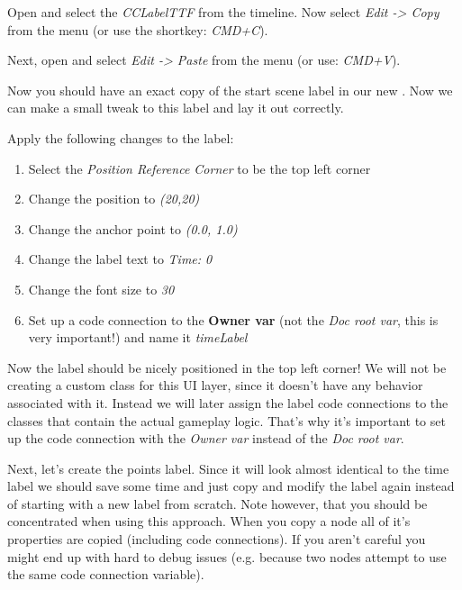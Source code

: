 \begin{leftbar}
Open  and select the \textit{CCLabelTTF} from the
timeline. Now select \textit{Edit -> Copy} from the \SB{} menu (or use the
shortkey: \textit{CMD+C}). 

Next, open  and select \textit{Edit -> Paste} from
the \SB{} menu (or use: \textit{CMD+V}).
\end{leftbar}

Now you should have an exact copy of the start scene label in our new
\ccbfile{}. Now we can make a small tweak to this label and lay it out
correctly.

\begin{leftbar}
Apply the following changes to the label:
\begin{enumerate}
  \item Select the \textit{Position Reference Corner} to be the top left corner
  \item Change the position to \textit{(20,20)}
  \item Change the anchor point to \textit{(0.0, 1.0)}
  \item Change the label text to \textit{Time: 0}
  \item Change the font size to \textit{30}
  \item Set up a code connection to the \textbf{Owner var} (not the \textit{Doc
  root var}, this is very important!) and name it \textit{timeLabel}
\end{enumerate}
\end{leftbar}

Now the label should be nicely positioned in the top left corner! We will not be
creating a custom class for this UI layer, since it doesn't have any behavior
associated with it. Instead we will later assign the label code connections to
the classes that contain the actual gameplay logic. That's why it's important to set up the code connection with the \textit{Owner var} instead of the \textit{Doc root var}.

Next, let's create the points label. Since it will look almost identical to the
time label we should save some time and just copy and modify the label again
instead of starting with a new label from scratch. Note however, that you should
be concentrated when using this approach. When you copy a node all of it's
properties are copied (including code connections). If you aren't careful you
might end up with hard to debug issues (e.g. because two nodes attempt to use
the same code connection variable).

